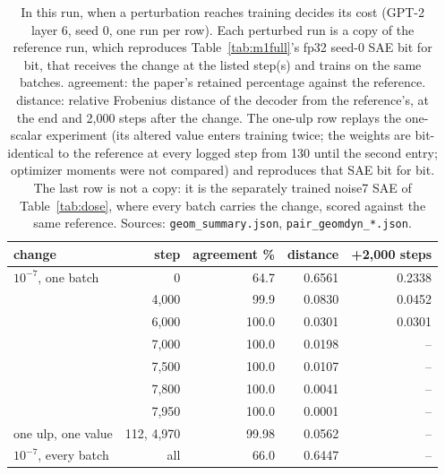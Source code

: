 \begin{table}[htbp]
\caption{In this run, when a perturbation reaches training decides its cost (GPT-2 layer 6, seed 0, one run per row). Each perturbed run is a copy of the reference run, which reproduces Table~\ref{tab:m1full}'s fp32 seed-0 SAE bit for bit, that receives the change at the listed step(s) and trains on the same batches. agreement: the paper's retained percentage against the reference. distance: relative Frobenius distance of the decoder from the reference's, at the end and 2,000 steps after the change. The one-ulp row replays the one-scalar experiment (its altered value enters training twice; the weights are bit-identical to the reference at every logged step from 130 until the second entry; optimizer moments were not compared) and reproduces that SAE bit for bit. The last row is not a copy: it is the separately trained noise7 SAE of Table~\ref{tab:dose}, where every batch carries the change, scored against the same reference. Sources: \texttt{geom\_summary.json}, \texttt{pair\_geomdyn\_*.json}.}
\label{tab:dynamics}
\centering\small
\begin{tabular}{lrrrr}
\toprule
change & step & agreement \% & distance & +2{,}000 steps \\
\midrule
$10^{-7}$, one batch & 0 & 64.7 & 0.6561 & 0.2338 \\
 & 4{,}000 & 99.9 & 0.0830 & 0.0452 \\
 & 6{,}000 & 100.0 & 0.0301 & 0.0301 \\
 & 7{,}000 & 100.0 & 0.0198 & -- \\
 & 7{,}500 & 100.0 & 0.0107 & -- \\
 & 7{,}800 & 100.0 & 0.0041 & -- \\
 & 7{,}950 & 100.0 & 0.0001 & -- \\
\midrule
one ulp, one value & 112, 4{,}970 & 99.98 & 0.0562 & -- \\
$10^{-7}$, every batch & all & 66.0 & 0.6447 & -- \\
\bottomrule
\end{tabular}
\end{table}
